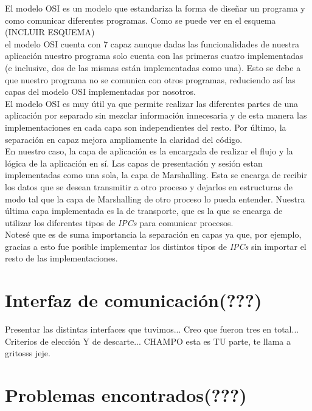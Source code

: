 \documentclass[a4paper,10pt]{article}
\begin{document}
El modelo OSI es un modelo que estandariza la forma de diseñar un programa y como comunicar diferentes programas. Como se puede ver en el esquema\\
 (INCLUIR ESQUEMA)\\
 el modelo OSI cuenta con 7 capaz aunque dadas las funcionalidades de nuestra aplicación nuestro programa solo cuenta con las primeras cuatro implementadas (e inclusive, dos de las
  mismas están implementadas como una). Esto se debe a que nuestro programa no se comunica con otros programas, reduciendo así las capas del modelo OSI implementadas por nosotros.\\

El modelo OSI es muy útil ya que permite realizar las diferentes partes de una aplicación por separado sin mezclar información innecesaria y de esta manera las implementaciones 
en cada capa son independientes del resto. Por último, la separación en capaz mejora ampliamente la claridad del código.\\

En nuestro caso, la capa de aplicación es la encargada de realizar el flujo y la lógica de la aplicación en sí. Las capas de presentación y sesión estan implementadas como una sola,
 la capa de Marshalling. Esta se encarga de recibir los datos que se desean transmitir a otro proceso y dejarlos en estructuras de modo tal que la capa de Marshalling de otro proceso 
 lo pueda entender. Nuestra última capa implementada es la de transporte, que es la que se encarga de utilizar los diferentes tipos de \textit{IPCs} para comunicar procesos.\\

Notesé que es de suma importancia la separación en capas ya que, por ejemplo, gracias a esto fue posible implementar los distintos tipos de \textit{IPCs} sin importar el resto de las implementaciones.\\

\newpage
\section{Interfaz de comunicación(???)}
Presentar las distintas interfaces que tuvimos...
Creo que fueron tres en total... 
Criterios de elección Y de descarte...
CHAMPO esta es TU parte, te llama a gritosss jeje.

\newpage
\section{Problemas encontrados(???)}
\end{document}
